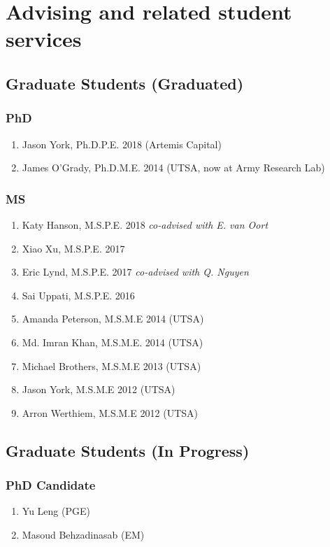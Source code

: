 \section*{Advising and related student services}



\subsection*{Graduate Students (Graduated)}

\subsubsection*{PhD}
\begin{enumerate}
    \item Jason York, Ph.D.P.E. 2018 (Artemis Capital) 
    \item James O'Grady, Ph.D.M.E. 2014 (UTSA, now at Army Research Lab)
\end{enumerate}

\subsubsection*{MS}
\begin{enumerate}
    \item Katy Hanson, M.S.P.E. 2018 \emph{co-advised with E. van Oort}
    \item Xiao Xu, M.S.P.E. 2017
    \item Eric Lynd, M.S.P.E. 2017  \emph{co-advised with Q. Nguyen}
    \item Sai Uppati, M.S.P.E. 2016
    \item Amanda Peterson, M.S.M.E 2014 (UTSA)
    \item Md. Imran Khan, M.S.M.E. 2014 (UTSA)
    \item Michael Brothers, M.S.M.E 2013 (UTSA)
    \item Jason York, M.S.M.E 2012 (UTSA)
    \item Arron Werthiem, M.S.M.E 2012 (UTSA)
\end{enumerate}

\subsection*{Graduate Students (In Progress)}

\subsubsection*{PhD Candidate}
\begin{enumerate}
    \item Yu Leng (PGE)
    \item Masoud Behzadinasab (EM)
\end{enumerate}

